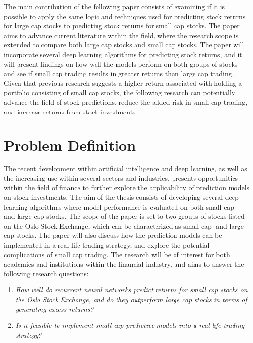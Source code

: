 \indent \newline 
The main contribution of the following paper consists of examining if it is possible to apply the same logic and techniques used for predicting stock returns for large cap stocks to predicting stock returns for small cap stocks. The paper aims to advance current literature within the field, where the research scope is extended to compare both large cap stocks and small cap stocks. The paper will incorporate several deep learning algorithms for predicting stock returns, and it will present findings on how well the models perform on both groups of stocks and see if small cap trading results in greater returns than large cap trading. Given that previous research suggests a higher return associated with holding a portfolio consisting of small cap stocks, the following research can potentially advance the field of stock predictions, reduce the added risk in small cap trading, and increase returns from stock investments.  

\section{Problem Definition}
The recent development within artificial intelligence and deep learning, as well as the increasing use within several sectors and industries, presents opportunities within the field of finance to further explore the applicability of prediction models on stock investments. The aim of the thesis consists of developing several deep learning algorithms where model performance is evaluated on both small cap- and large cap stocks. The scope of the paper is set to two groups of stocks listed on the Oslo Stock Exchange, which can be characterized as small cap- and large cap stocks. The paper will also discuss how the prediction models can be implemented in a real-life trading strategy, and explore the potential complications of small cap trading. The research will be of interest for both academics and institutions within the financial industry, and aims to answer the following research questions:  

\indent \newline
\begin{enumerate}
\item \textit{How well do recurrent neural networks predict returns for small cap stocks on the Oslo Stock Exchange, and do they outperform large cap stocks in terms of generating excess returns?}
\item \textit{Is it feasible to implement small cap predictive models into a real-life trading strategy?}
\end{enumerate}

